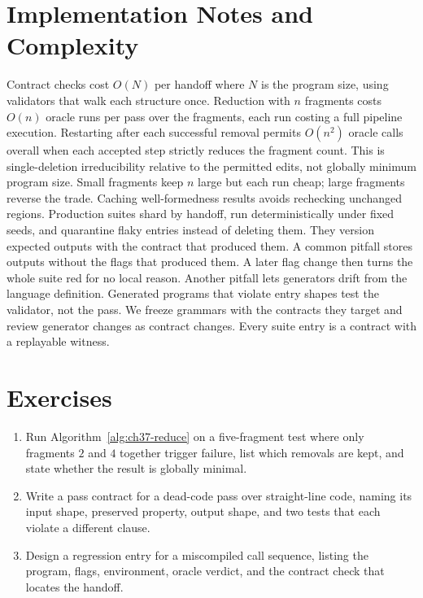 \section{Implementation Notes and Complexity}\label{sec:ch37-implementation}

Contract checks cost $O(N)$ per handoff where $N$ is the program size, using validators that walk each structure once.
Reduction with $n$ fragments costs $O(n)$ oracle runs per pass over the fragments, each run costing a full pipeline execution.
Restarting after each successful removal permits $O(n^2)$ oracle calls overall when each accepted step strictly reduces the fragment count.
This is single-deletion irreducibility relative to the permitted edits, not globally minimum program size.
Small fragments keep $n$ large but each run cheap; large fragments reverse the trade.
Caching well-formedness results avoids rechecking unchanged regions.
Production suites shard by handoff, run deterministically under fixed seeds, and quarantine flaky entries instead of deleting them.
They version expected outputs with the contract that produced them.
A common pitfall stores outputs without the flags that produced them.
A later flag change then turns the whole suite red for no local reason.
Another pitfall lets generators drift from the language definition.
Generated programs that violate entry shapes test the validator, not the pass.
We freeze grammars with the contracts they target and review generator changes as contract changes.
Every suite entry is a contract with a replayable witness.

\section{Exercises}\label{sec:ch37-exercises}

\begin{enumerate}
\item Run Algorithm~\ref{alg:ch37-reduce} on a five-fragment test where only fragments $2$ and $4$ together trigger failure, list which removals are kept, and state whether the result is globally minimal.\label{ex:ch37-reduce-trace}
\item Write a pass contract for a dead-code pass over straight-line code, naming its input shape, preserved property, output shape, and two tests that each violate a different clause.\label{ex:ch37-contract-write}
\item Design a regression entry for a miscompiled call sequence, listing the program, flags, environment, oracle verdict, and the contract check that locates the handoff.\label{ex:ch37-entry-design}
\end{enumerate}

